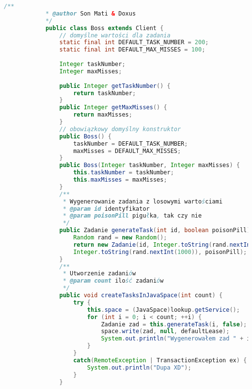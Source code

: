 			\begin{lstlisting}[language=Java]
			/**
			* @author Son Mati & Doxus
			*/
			public class Boss extends Client {
				// domyślne wartości dla zadania
				static final int DEFAULT_TASK_NUMBER = 200;
				static final int DEFAULT_MAX_MISSES = 100;
				
				Integer taskNumber;
				Integer maxMisses;
				
				public Integer getTaskNumber() {
					return taskNumber;
				}
				public Integer getMaxMisses() {
					return maxMisses;
				}
				// obowiązkowy domyślny konstruktor
				public Boss() {
					taskNumber = DEFAULT_TASK_NUMBER;
					maxMisses = DEFAULT_MAX_MISSES;
				}
				public Boss(Integer taskNumber, Integer maxMisses) {
					this.taskNumber = taskNumber;
					this.maxMisses = maxMisses;
				}
				/**
				 * Wygenerowanie zadania z losowymi wartościami
				 * @param id identyfikator
				 * @param poisonPill pigułka, tak czy nie
				 */
				public Zadanie generateTask(int id, boolean poisonPill) {
					Random rand = new Random();
					return new Zadanie(id, Integer.toString(rand.nextInt(1000)),
					Integer.toString(rand.nextInt(1000)), poisonPill);
				}
				/**
				 * Utworzenie zadaniów
				 * @param count ilość zadaniów
				 */
				public void createTasksInJavaSpace(int count) {
					try {
						this.space = (JavaSpace)lookup.getService();
						for (int i = 0; i < count; ++i) {
							Zadanie zad = this.generateTask(i, false);
							space.write(zad, null, defaultLease);
							System.out.println("Wygenerowałem zad " + i + " o stringach " + zad.napis1 + " i " + zad.napis2);
						}
					}
					catch(RemoteException | TransactionException ex) {
						System.out.println("Dupa XD");
					}
				}
			\end{lstlisting}
			\newpage
